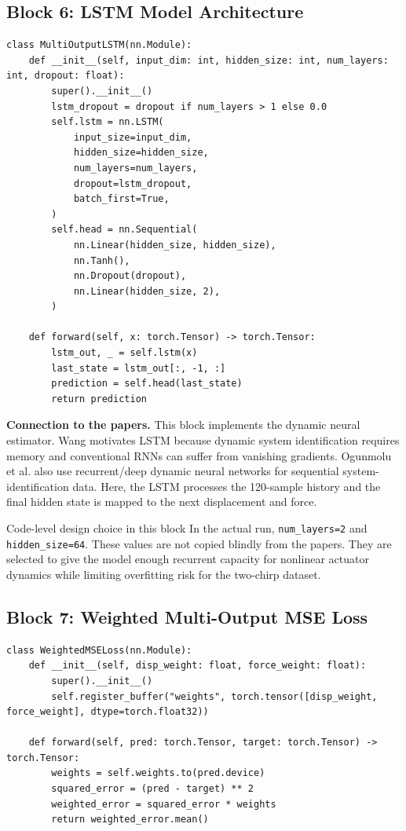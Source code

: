\documentclass[11pt]{article}
\begin{document}
\subsection{Block 6: LSTM Model Architecture}
\begin{lstlisting}[style=pythonstyle]
class MultiOutputLSTM(nn.Module):
    def __init__(self, input_dim: int, hidden_size: int, num_layers: int, dropout: float):
        super().__init__()
        lstm_dropout = dropout if num_layers > 1 else 0.0
        self.lstm = nn.LSTM(
            input_size=input_dim,
            hidden_size=hidden_size,
            num_layers=num_layers,
            dropout=lstm_dropout,
            batch_first=True,
        )
        self.head = nn.Sequential(
            nn.Linear(hidden_size, hidden_size),
            nn.Tanh(),
            nn.Dropout(dropout),
            nn.Linear(hidden_size, 2),
        )

    def forward(self, x: torch.Tensor) -> torch.Tensor:
        lstm_out, _ = self.lstm(x)
        last_state = lstm_out[:, -1, :]
        prediction = self.head(last_state)
        return prediction
\end{lstlisting}

\noindent\textbf{Connection to the papers.}
This block implements the dynamic neural estimator. Wang motivates LSTM because dynamic system identification requires memory and conventional RNNs can suffer from vanishing gradients. Ogunmolu et al. also use recurrent/deep dynamic neural networks for sequential system-identification data. Here, the LSTM processes the 120-sample history and the final hidden state is mapped to the next displacement and force.

\begin{architecturedecisionbox}{Code-level design choice in this block}
In the actual run, \texttt{num\_layers=2} and \texttt{hidden\_size=64}. These values are not copied blindly from the papers. They are selected to give the model enough recurrent capacity for nonlinear actuator dynamics while limiting overfitting risk for the two-chirp dataset.
\end{architecturedecisionbox}

\subsection{Block 7: Weighted Multi-Output MSE Loss}
\begin{lstlisting}[style=pythonstyle]
class WeightedMSELoss(nn.Module):
    def __init__(self, disp_weight: float, force_weight: float):
        super().__init__()
        self.register_buffer("weights", torch.tensor([disp_weight, force_weight], dtype=torch.float32))

    def forward(self, pred: torch.Tensor, target: torch.Tensor) -> torch.Tensor:
        weights = self.weights.to(pred.device)
        squared_error = (pred - target) ** 2
        weighted_error = squared_error * weights
        return weighted_error.mean()
\end{lstlisting}
\end{document}
